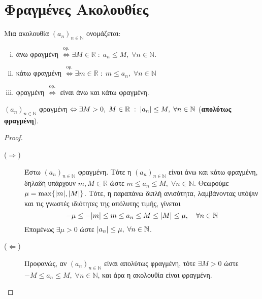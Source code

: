\section{Φραγμένες Ακολουθίες}

\begin{mybox1}
  \begin{dfn}
    Μια ακολουθία $ (a_{n})_{n \in \mathbb{N}} $ ονομάζεται:
    \begin{enumerate}[i)]
      \item \textcolor{Col1}{άνω φραγμένη} 
        $ \overset{\text{ορ.}}{\Leftrightarrow} \exists M \in 
        \mathbb{R} \; : \; a_{n} \leq M, \; \forall n \in \mathbb{N}$.
      \item \textcolor{Col1}{κάτω φραγμένη} 
        $ \overset{\text{ορ.}}{\Leftrightarrow} \exists m \in 
        \mathbb{R} \; : \; m \leq a_{n}, \; \forall n \in \mathbb{N}  $
      \item \textcolor{Col1}{φραγμένη} 
        $ \overset{\text{ορ.}}{\Leftrightarrow} $ είναι άνω και κάτω φραγμένη.
    \end{enumerate}
  \end{dfn}
\end{mybox1}

\begin{mybox3}
  \begin{prop}\label{prop:apolfragm}
    {$ (a_{n})_{n \in \mathbb{N}} $ φραγμένη $ \Leftrightarrow \exists M>0, 
      \; M \in \mathbb{R} \; : \; \abs{a_{n}} \leq M, \; \forall n \in \mathbb{N} $ 
    (\textbf{απολύτως φραγμένη}).}
  \end{prop}
\end{mybox3}

\begin{proof}
\item {}
  \begin{description}
    \item [($ \Rightarrow $)] Έστω $ (a_{n})_{n \in \mathbb{N}} $ φραγμένη. Τότε η 
      $ (a_{n})_{n \in \mathbb{N}} $ είναι άνω και κάτω φραγμένη, δηλαδή υπάρχουν 
      $ m,M \in \mathbb{R} $ ώστε $ m \leq a_{n} \leq M, \; \forall n \in \mathbb{N} $.
      Θεωρούμε $ \mu = \max \{ \abs{m} , \abs{M} \} $. Τότε, η παραπάνω διπλή 
      ανισότητα, λαμβάνοντας υπόψιν και τις γνωστές ιδιότητες της απόλυτης τιμής, 
      γίνεται
      \[
        - \mu \leq - \abs{m} \leq m \leq a_{n} \leq M \leq \abs{M} \leq \mu , 
        \quad \forall n \in \mathbb{N}
      \]
      Επομένως $ \exists \mu > 0 $ ώστε 
      $ \abs{a_{n}} \leq \mu, \; \forall n \in \mathbb{N} $.
    \item [($ \Leftarrow$)] Προφανώς, αν $( a_{n})_{n \in \mathbb{N}} $ είναι 
      απολύτως φραγμένη, τότε $ \exists M>0 $ ώστε $ -M \leq a_{n} \leq M, \; \forall n
      \in \mathbb{N} $, και άρα η ακολουθία είναι φραγμένη. 
  \end{description}
\end{proof}

